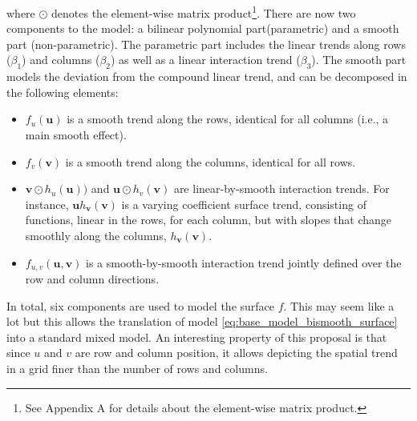 where $\odot$ denotes the element-wise matrix product\footnote{See Appendix A for details about the element-wise matrix product.}. There are now two components to the model: a bilinear polynomial part(parametric) and a smooth part (non-parametric). The parametric part includes the linear trends along rows ($\beta_1$) and columns ($\beta_2$) as well as a linear interaction trend ($\beta_3$). The smooth part models the deviation from the compound linear trend, and can be decomposed in the following elements:
\begin{itemize}
\item $f _ { u } ( \boldsymbol { u } )$  is a smooth trend along the rows, identical for all columns (i.e., a main smooth effect).
\item $f _ {v} ( \boldsymbol { v} )$ is a smooth trend along the columns, identical for all rows.
\item $\boldsymbol { v } \odot h _ { u } ( \boldsymbol { u } ))$ and $\boldsymbol { u } \odot h _ { v } ( \boldsymbol { v } )$ are linear-by-smooth interaction trends. For instance, $\boldsymbol { u }h_\boldsymbol { v}(\boldsymbol { v})$ is a varying coefficient surface trend, consisting of functions, linear in the rows, for each column, but with slopes that change smoothly along the columns, $h_\boldsymbol { v}(\boldsymbol { v})$.
\item $f _ { u , v } ( \boldsymbol { u } , \boldsymbol { v } )$ is a smooth-by-smooth interaction trend jointly defined over the row and column directions.
\end{itemize}
In total, six components are used to model the surface $f$. This may seem like a lot but this allows the translation of model \ref{eq:base_model_bismooth_surface} into a standard mixed model. An interesting property of this proposal is that since $u$ and $v$ are row and column position, it allows depicting the spatial trend in a grid finer than the number of rows and columns.


